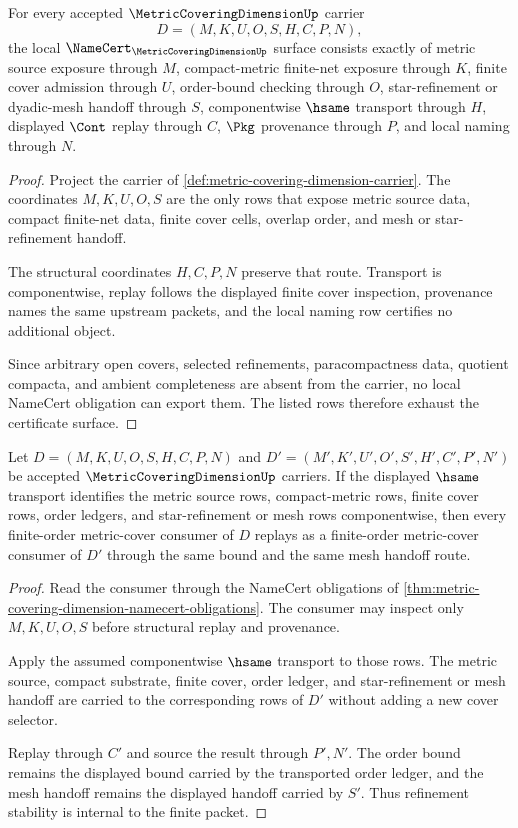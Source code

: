 \begin{theorem}
\label{thm:metric-covering-dimension-namecert-obligations}
For every accepted $\MetricCoveringDimensionUp$ carrier
$$
D=(M,K,U,O,S,H,C,P,N),
$$
the local $\NameCert_{\MetricCoveringDimensionUp}$ surface consists exactly of metric source exposure through $M$, compact-metric finite-net exposure through $K$, finite cover admission through $U$, order-bound checking through $O$, star-refinement or dyadic-mesh handoff through $S$, componentwise $\hsame$ transport through $H$, displayed $\Cont$ replay through $C$, $\Pkg$ provenance through $P$, and local naming through $N$.
\end{theorem}
\begin{proof}
Project the carrier of \autoref{def:metric-covering-dimension-carrier}. The coordinates $M,K,U,O,S$ are the only rows that expose metric source data, compact finite-net data, finite cover cells, overlap order, and mesh or star-refinement handoff.

The structural coordinates $H,C,P,N$ preserve that route. Transport is componentwise, replay follows the displayed finite cover inspection, provenance names the same upstream packets, and the local naming row certifies no additional object.

Since arbitrary open covers, selected refinements, paracompactness data, quotient compacta, and ambient completeness are absent from the carrier, no local NameCert obligation can export them. The listed rows therefore exhaust the certificate surface.
\end{proof}

\begin{theorem}
\label{thm:metric-covering-dimension-refinement-stability}
Let $D=(M,K,U,O,S,H,C,P,N)$ and $D'=(M',K',U',O',S',H',C',P',N')$ be accepted $\MetricCoveringDimensionUp$ carriers. If the displayed $\hsame$ transport identifies the metric source rows, compact-metric rows, finite cover rows, order ledgers, and star-refinement or mesh rows componentwise, then every finite-order metric-cover consumer of $D$ replays as a finite-order metric-cover consumer of $D'$ through the same bound and the same mesh handoff route.
\end{theorem}
\begin{proof}
Read the consumer through the NameCert obligations of \autoref{thm:metric-covering-dimension-namecert-obligations}. The consumer may inspect only $M,K,U,O,S$ before structural replay and provenance.

Apply the assumed componentwise $\hsame$ transport to those rows. The metric source, compact substrate, finite cover, order ledger, and star-refinement or mesh handoff are carried to the corresponding rows of $D'$ without adding a new cover selector.

Replay through $C'$ and source the result through $P',N'$. The order bound remains the displayed bound carried by the transported order ledger, and the mesh handoff remains the displayed handoff carried by $S'$. Thus refinement stability is internal to the finite packet.
\end{proof}

